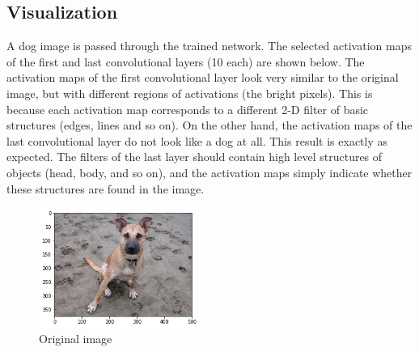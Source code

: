 \documentclass{article}
\begin{document}
\subsection{Visualization}
A dog image is passed through the trained network. The selected activation maps of the first and last convolutional layers (10 each) are shown below. The activation maps of the first convolutional layer look very similar to the original image, but with different regions of activations (the bright pixels). This is because each activation map corresponds to a different 2-D filter of basic structures (edges, lines and so on). On the other hand, the activation maps of the last convolutional layer do not look like a dog at all. This result is exactly as expected. The filters of the last layer should contain high level structures of objects (head, body, and so on), and the activation maps simply indicate whether these structures are found in the image.\\

\begin{figure}[h!]
		\centering
		\includegraphics[width=0.47\textwidth]{part2_pics/original_img.png}
		\caption{Original image}
\end{figure}
\end{document}
